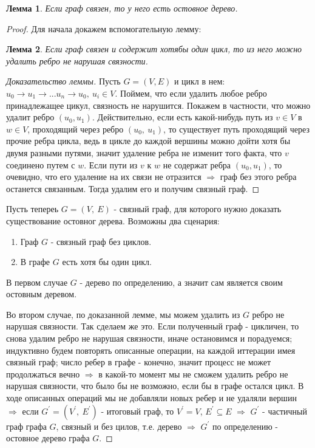 \documentclass[a4paper,12pt]{article}
\newtheorem*{Lemma}{Лемма}
\begin{document}
	\begin{Lemma} 
		Если граф связен, то у него есть остовное дерево. 
	\end{Lemma}

	\begin{proof}
	Для начала докажем вспомогательную лемму:
		\begin{Lemma} Если граф связен и содержит хотябы один цикл, то из него можно удалить ребро не нарушая связности. 
		\end{Lemma}

		\begin{proof}[Доказательство леммы]
		Пусть $ G = (V, E) $ и цикл в нем: $ u_0 \rightarrow u_1 \rightarrow ... u_n \rightarrow u_0,\ u_i \in V$. Поймем, что если удалить любое ребро принадлежащее цикул, связность не нарушится. Покажем в частности, что можно удалит ребро $(u_0, u_1)$. Действительно, если есть какой-нибудь путь из $v  \in V$ в $w \in V$, проходящий через ребро $ (u_0,\ u_1) $, то существует путь проходящий через прочие ребра цикла, ведь в цикле до каждой вершины можно дойти хотя бы двумя разными путями, значит удаление ребра не изменит того факта, что $v$ соединено путем с $w$. Если пути из $v$ к $w$ не содержат ребра $(u_0, u_1)$, то очевидно, что его удаление на их связи не отразится $\Rightarrow$ граф без этого ребра останется связанным. Тогда удалим его и получим связный граф.
		\end{proof}

		Пусть тепереь $G = (V,\ E)$ - связный граф, для которого нужно доказать существование остовног дерева. Возможны два сценария:
			\begin{enumerate} 
			\item Граф $G$ - связный граф без циклов.
			\item В графе $G$ есть хотя бы один цикл. 
			\end{enumerate}

		В первом случае $G$ - дерево по определению, а значит сам является своим остовным деревом.

		Во втором случае, по доказанной лемме, мы можем удалить из $G$ ребро не нарушая связности. Так сделаем же это. Если полученный граф - цикличен, то снова удалим ребро не нарушая связности, иначе остановимся и порадуемся; индуктивно будем повторять описанные операции, на каждой иттерации имея связный граф; число ребер в графе - конечно, значит процесс не может продолжаться вечно $\Rightarrow$ в какой-то момент мы не сможем удалить ребро не нарушая связности, что было бы не возможно, если бы в графе остался цикл. В ходе описанных операций мы не добавляли новых ребер и не удаляли вершин $\Rightarrow$ если  $G^{\prime} = (V^{\prime},\ E^{\prime})$ - итоговый граф, то $V^{\prime} = V$, $E^{\prime} \subseteq E$ $\Rightarrow$ $G^{\prime}$ - частичный граф графа $G$, связный и без цилов, т.е. дерево $\Rightarrow$ $G^{\prime}$ по определению - остовное дерево графа $G$.
	\end{proof}
\end{document}
